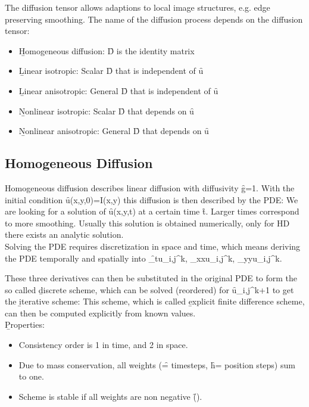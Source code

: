 The diffusion tensor allows adaptions to local image structures, e.g. edge preserving smoothing. The name of the diffusion process depends on the diffusion tensor:
\begin{itemize}
    \item \b{Homogeneous diffusion:} \f{D} is the identity matrix
    \item \b{Linear isotropic:} Scalar \f{D} that is independent of \f{u}
    \item \b{Linear anisotropic:} General \f{D} that is independent of \f{u}
    \item \b{Nonlinear isotropic:} Scalar \f{D} that depends on \f{u}
    \item \b{Nonlinear anisotropic:} General \f{D} that depends on \f{u}
\end{itemize}

\subsection{Homogeneous Diffusion}
Homogeneous diffusion describes linear diffusion with diffusivity \f{g=1}. With the initial condition \f{u(x,y,0)=I(x,y)} this diffusion is then described by the PDE:
We are looking for a solution of \f{u(x,y,t)} at a certain time \f{t}. Larger times correspond to more smoothing. Usually this solution is obtained numerically, only for HD there exists an analytic solution.\\

Solving the PDE requires discretization in space and time, which means deriving the PDE temporally and spatially into \f{\delta_tu_{i,j}^k, \delta_{xx}u_{i,j}^k, \delta_{yy}u_{i,j}^k}.

These three derivatives can then be substituted in the original PDE to form the so called \b{discrete scheme}, which can be solved (reordered) for \f{u_{i,j}^{k+1}} to get the \b{iterative scheme}:
This scheme, which is called \b{explicit finite difference scheme}, can then be computed explicitly from known values. \\
\b{Properties:}
\begin{itemize}
    \item Consistency order is 1 in time, and 2 in space.
    \item Due to mass conservation, all weights (\f{\tau=} timesteps, \f{h=} position steps) sum to one.
    \item Scheme is stable if all weights are non negative (\f{\leq{}}).
\end{itemize}

